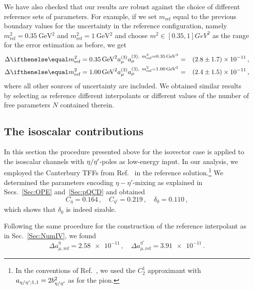 We have also checked that our results are robust against the choice of different reference sets of parameters. For example, if we set $m_\text{ref}$ equal to the previous boundary values for the uncertainty in the reference configuration, namely $m_\text{ref}^2 = \SI{0.35}{\GeV^2}$ and $m_\text{ref}^2 = \SI{1}{\GeV^2}$ and choose $m^2\in [0.35, 1]\si{GeV^2}$ as the range for the error estimation as before, we get
\begin{eqnarray}
\Delta \aPion[m_\text{ref}^2 = \SI{0.35}{\GeV^2}] & = & \num[separate-uncertainty]{2.8\pm 1.7e-11}\,, \nonumber \\
\Delta \aPion[m_\text{ref}^2 = \SI{1.00}{\GeV^2}] & = & \num[separate-uncertainty]{2.4\pm 1.5e-11}\,,
\end{eqnarray}
where all other sources of uncertainty are included. We obtained similar results by selecting as reference different interpolants or different values of the number of free parameters $N$ contained therein.


\subsection{The isoscalar contributions}
\label{Sec:NumIS}
In this section the procedure presented above for the isovector case is applied to the isoscalar channels with ${\eta / \eta'}$-poles as low-energy input. In our analysis, we employed the Canterbury TFFs from Ref.~\cite{Canterbury} in the reference solution.\footnote{In the conventions of  Ref.~\cite{Canterbury}, we used the $C^1_2$ approximant with $a_{{\eta / \eta'};1,1} = 2 b_{{\eta / \eta'}}^2$ as for the pion.} We determined the parameters encoding $\eta-\eta'$-mixing as explained in Secs.~\ref{Sec:OPE} and~\ref{Sec:pQCD} and obtained
\begin{equation}
C_\eta = \num{0.164}\,, \quad C_{\eta'} = \num{0.219}\,, \quad \delta_0 = \num{0.110}\,,
\label{Eq:CCan}
\end{equation}
which shows that $\delta_0$ is indeed sizable.

Following the same procedure for the construction of the reference interpolant as in Sec.~\ref{Sec:NumIV}, we found
\begin{equation}
\Delta a_{\mu, \text{ref}}^\eta = \num{2.58e-11}\,, \quad \Delta a_{\mu, \text{ref}}^{\eta'} = \num{3.91e-11}\,.
\end{equation}

